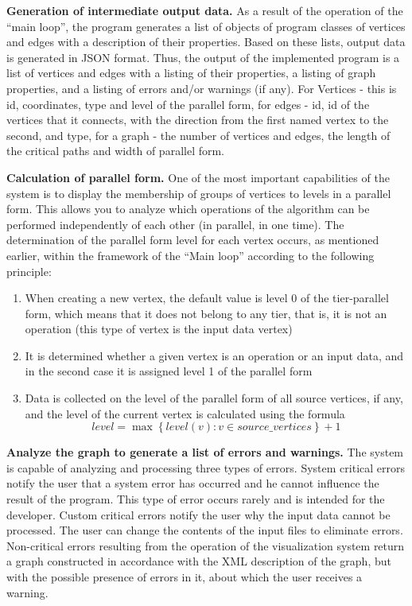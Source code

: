 \textbf{Generation of intermediate output data.} As a result of the operation of the “main loop”, the program generates a list of objects of program classes of vertices and edges with a description of their properties. Based on these lists, output data is generated in JSON format. Thus, the output of the implemented program is a list of vertices and edges with a listing of their properties, a listing of graph properties, and a listing of errors and/or warnings (if any). For Vertices - this is id, coordinates, type and level of the parallel form, for edges - id, id of the vertices that it connects, with the direction from the first named vertex to the second, and type, for a graph - the number of vertices and edges, the length of the critical paths and width of parallel form.

\textbf{Calculation of parallel form.} One of the most important capabilities of the system is to display the membership of groups of vertices to levels in a parallel form. This allows you to analyze which operations of the algorithm can be performed independently of each other (in parallel, in one time). The determination of the parallel form level for each vertex occurs, as mentioned earlier, within the framework of the “Main loop” according to the following principle:

\begin{enumerate}
    \item When creating a new vertex, the default value is level 0 of the tier-parallel form, which means that it does not belong to any tier, that is, it is not an operation (this type of vertex is the input data vertex)
    \item It is determined whether a given vertex is an operation or an input data, and in the second case it is assigned level 1 of the parallel form
    \item Data is collected on the level of the parallel form of all source vertices, if any, and the level of the current vertex is calculated using the formula
    $$ level = \max\left\{level(v): v \in source\_vertices\right\} + 1 $$
\end{enumerate}

\textbf{Analyze the graph to generate a list of errors and warnings.} The system is capable of analyzing and processing three types of errors. System critical errors notify the user that a system error has occurred and he cannot influence the result of the program. This type of error occurs rarely and is intended for the developer. Custom critical errors notify the user why the input data cannot be processed. The user can change the contents of the input files to eliminate errors. Non-critical errors resulting from the operation of the visualization system return a graph constructed in accordance with the XML description of the graph, but with the possible presence of errors in it, about which the user receives a warning.

